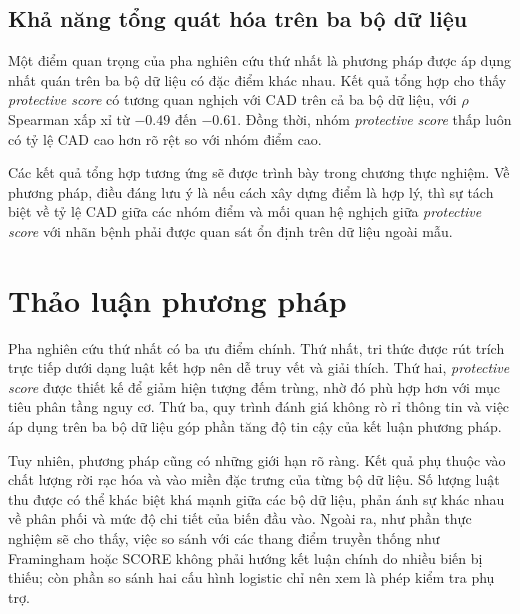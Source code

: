 \blocksep

\subsection{Khả năng tổng quát hóa trên ba bộ dữ liệu}

\blocksep

Một điểm quan trọng của pha nghiên cứu thứ nhất là phương pháp được áp dụng nhất quán trên ba bộ dữ liệu có đặc điểm khác nhau. Kết quả tổng hợp cho thấy \textit{protective score} có tương quan nghịch với CAD trên cả ba bộ dữ liệu, với $\rho$ Spearman xấp xỉ từ $-0.49$ đến $-0.61$. Đồng thời, nhóm \textit{protective score} thấp luôn có tỷ lệ CAD cao hơn rõ rệt so với nhóm điểm cao.

\blocksep

Các kết quả tổng hợp tương ứng sẽ được trình bày trong chương thực nghiệm. Về phương pháp, điều đáng lưu ý là nếu cách xây dựng điểm là hợp lý, thì sự tách biệt về tỷ lệ CAD giữa các nhóm điểm và mối quan hệ nghịch giữa \textit{protective score} với nhãn bệnh phải được quan sát ổn định trên dữ liệu ngoài mẫu.

\blocksep

\section{Thảo luận phương pháp}

\blocksep

Pha nghiên cứu thứ nhất có ba ưu điểm chính. Thứ nhất, tri thức được rút trích trực tiếp dưới dạng luật kết hợp nên dễ truy vết và giải thích. Thứ hai, \textit{protective score} được thiết kế để giảm hiện tượng đếm trùng, nhờ đó phù hợp hơn với mục tiêu phân tầng nguy cơ. Thứ ba, quy trình đánh giá không rò rỉ thông tin và việc áp dụng trên ba bộ dữ liệu góp phần tăng độ tin cậy của kết luận phương pháp.

\blocksep

Tuy nhiên, phương pháp cũng có những giới hạn rõ ràng. Kết quả phụ thuộc vào chất lượng rời rạc hóa và vào miền đặc trưng của từng bộ dữ liệu. Số lượng luật thu được có thể khác biệt khá mạnh giữa các bộ dữ liệu, phản ánh sự khác nhau về phân phối và mức độ chi tiết của biến đầu vào. Ngoài ra, như phần thực nghiệm sẽ cho thấy, việc so sánh với các thang điểm truyền thống như Framingham hoặc SCORE không phải hướng kết luận chính do nhiều biến bị thiếu; còn phần so sánh hai cấu hình logistic chỉ nên xem là phép kiểm tra phụ trợ.

\blocksep

